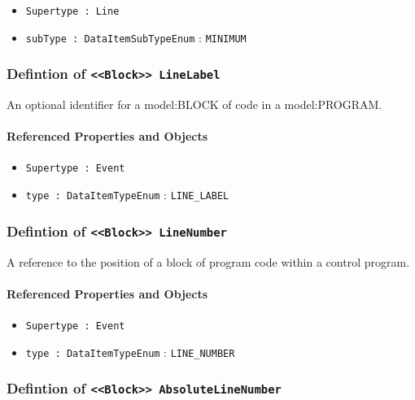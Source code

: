 \begin{itemize}
\item \texttt{Supertype : Line}

\item \texttt{subType : DataItemSubTypeEnum} : \texttt{MINIMUM}

\end{itemize}
\FloatBarrier
\subsubsection{Defintion of \texttt{<<Block>> LineLabel}}
  \label{type:LineLabel}

\FloatBarrier

An optional identifier for a {model:BLOCK} of code in a {model:PROGRAM}.

\FloatBarrier
\paragraph{Referenced Properties and Objects}

\begin{itemize}
\item \texttt{Supertype : Event}

\item \texttt{type : DataItemTypeEnum} : \texttt{LINE_LABEL}

\end{itemize}
\FloatBarrier
\subsubsection{Defintion of \texttt{<<Block>> LineNumber}}
  \label{type:LineNumber}

\FloatBarrier

A reference to the position of a block of program code within a control program.

\FloatBarrier
\paragraph{Referenced Properties and Objects}

\begin{itemize}
\item \texttt{Supertype : Event}

\item \texttt{type : DataItemTypeEnum} : \texttt{LINE_NUMBER}

\end{itemize}
\FloatBarrier
\subsubsection{Defintion of \texttt{<<Block>> AbsoluteLineNumber}}
  \label{type:AbsoluteLineNumber}

